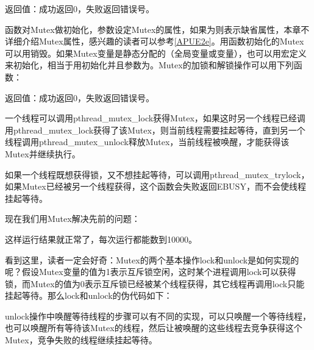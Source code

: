 返回值：成功返回0，失败返回错误号。



函数对Mutex做初始化，参数设定Mutex的属性，如果为则表示缺省属性，本章不详细介绍Mutex属性，感兴趣的读者可以参考\hyperlink{db.bi01.bibli.apue}{[APUE2e]}。用函数初始化的Mutex可以用销毁。如果Mutex变量是静态分配的（全局变量或变量），也可以用宏定义来初始化，相当于用初始化并且参数为。Mutex的加锁和解锁操作可以用下列函数：




返回值：成功返回0，失败返回错误号。



一个线程可以调用pthread\_\BookSplit{}mutex\_\BookSplit{}lock获得Mutex，如果这时另一个线程已经调用pthread\_\BookSplit{}mutex\_\BookSplit{}lock获得了该Mutex，则当前线程需要挂起等待，直到另一个线程调用pthread\_\BookSplit{}mutex\_\BookSplit{}unlock释放Mutex，当前线程被唤醒，才能获得该Mutex并继续执行。



如果一个线程既想获得锁，又不想挂起等待，可以调用pthread\_\BookSplit{}mutex\_\BookSplit{}trylock，如果Mutex已经被另一个线程获得，这个函数会失败返回EBUSY，而不会使线程挂起等待。



现在我们用Mutex解决先前的问题：




这样运行结果就正常了，每次运行都能数到10000。



看到这里，读者一定会好奇：Mutex的两个基本操作lock和unlock是如何实现的呢？假设Mutex变量的值为1表示互斥锁空闲，这时某个进程调用lock可以获得锁，而Mutex的值为0表示互斥锁已经被某个线程获得，其它线程再调用lock只能挂起等待。那么lock和unlock的伪代码如下：




unlock操作中唤醒等待线程的步骤可以有不同的实现，可以只唤醒一个等待线程，也可以唤醒所有等待该Mutex的线程，然后让被唤醒的这些线程去竞争获得这个Mutex，竞争失败的线程继续挂起等待。



